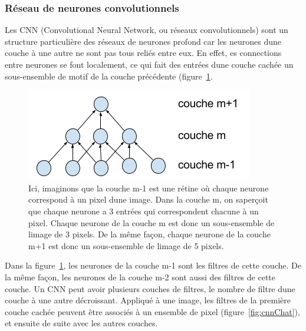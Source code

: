 \documentclass[11pt]{sdm}
\begin{document}
		\subsubsection{R\'eseau de neurones convolutionnels}
			Les CNN (Convolutional Neural Network, ou r\'eseaux convolutionnels) sont un structure particuli\`ere des r\'eseaux de neurones profond car les neurones d\textquotesingle une couche \`a une autre ne sont pas tous reli\'es entre eux. En effet, es connections entre neurones se font localement, ce qui fait des entr\'ees d\textquotesingle une couche cach\'ee un sous-ensemble de motif de la couche pr\'ec\'edente (figure~\ref{fig:cnn}.

			\begin{figure}[!ht]
				\centering
				\includegraphics[natwidth=375,natheight=152]{figures/architectureCNN.png}
				\caption{Ici, imaginons que la couche m-1 est une r\'etine o\`u chaque neurone correspond \`a un pixel d\textquotesingle une image. Dans la couche m, on s\textquotesingle aper\c coit que chaque neurone a 3 entr\'ees qui correspondent chacune \`a un pixel. Chaque neurone de la couche m est donc un sous-ensemble de l\textquotesingle image de 3 pixels. De la m\^eme fa\c con, chaque neurone de la couche m+1 est donc un sous-ensemble de l\textquotesingle image de 5 pixels.}
				\label{fig:cnn}
			\end{figure}

			Dans la figure~\ref{fig:cnn}, les neurones de la couche m-1 sont les filtres de cette couche. De la m\^eme fa\c con, les neurones de la couche m-2 sont aussi des filtres de cette couche. Un CNN peut avoir plusieurs couches de filtres, le nombre de filtre d\textquotesingle une couche \`a une autre d\'ecroissant.
			Appliqu\'e \`a une image, les filtres de la premi\`ere couche cach\'ee peuvent \^etre associ\'es \`a un ensemble de pixel (figure~\ref{fig:cnnChat}), et ensuite de suite avec les autres couches.
\end{document}
